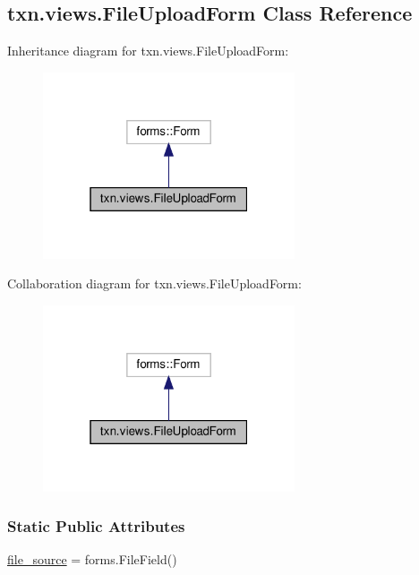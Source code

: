 \hypertarget{classtxn_1_1views_1_1FileUploadForm}{}\subsection{txn.\+views.\+File\+Upload\+Form Class Reference}
\label{classtxn_1_1views_1_1FileUploadForm}


Inheritance diagram for txn.\+views.\+File\+Upload\+Form\+:\nopagebreak
\begin{figure}[H]
\begin{center}
\leavevmode
\includegraphics[width=211pt]{classtxn_1_1views_1_1FileUploadForm__inherit__graph}
\end{center}
\end{figure}


Collaboration diagram for txn.\+views.\+File\+Upload\+Form\+:\nopagebreak
\begin{figure}[H]
\begin{center}
\leavevmode
\includegraphics[width=211pt]{classtxn_1_1views_1_1FileUploadForm__coll__graph}
\end{center}
\end{figure}
\subsubsection*{Static Public Attributes}
\begin{DoxyCompactItemize}
\item 
\hyperlink{classtxn_1_1views_1_1FileUploadForm_a9d4625c52738a29aa32d017757fe0b0e}{file\+\_\+source} = forms.\+File\+Field()
\end{DoxyCompactItemize}


